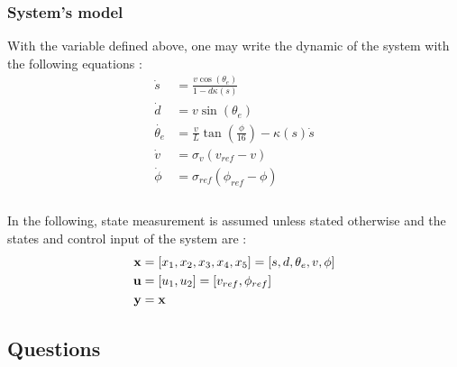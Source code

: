\subsubsection*{System's model}
With the variable defined above, one may write the dynamic of the system with the following equations :
\begin{align}
    \dot{s} &= \frac{v \cos(\theta_e)}{1 - d\kappa(s)}\\
    \dot{d} &= v \sin(\theta_e)\\
    \dot{\theta_e} &= \frac{v}{L}\tan(\frac{\phi}{16}) - \kappa(s)\dot{s}\\
    \dot{v} &= \sigma_v (v_{ref} - v)\\
    \dot{\phi} &= \sigma_{ref} (\phi_{ref} - \phi)\\
\end{align}
\\
In the following, state measurement is assumed unless stated otherwise and the states and control input of the system are :
\begin{align}
    \bold{x} &= [x_1, x_2, x_3, x_4, x_5] = [s,d,\theta_e, v, \phi]\\
    \bold{u} &= [u_1, u_2] = [v_{ref}, \phi_{ref}]\\
    \bold{y} &= \bold{x}
\end{align}


\subsection{Questions}
